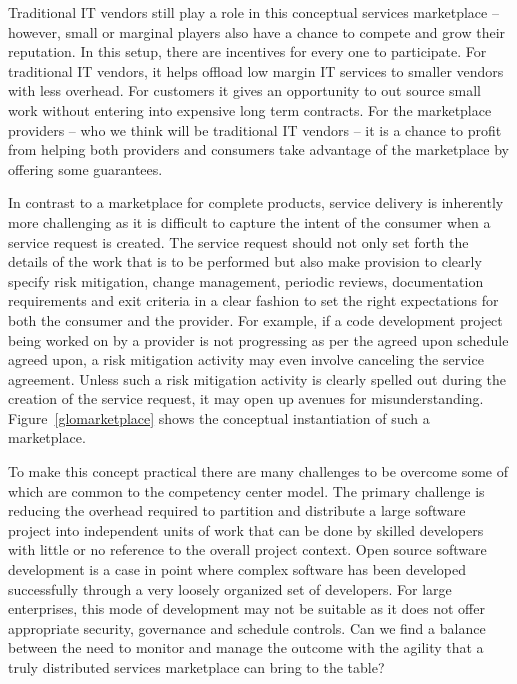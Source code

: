  Traditional IT vendors still play a role in this conceptual services marketplace -- however, small or marginal players also have a chance to compete and grow their reputation. In this setup, there are incentives for every one to participate. For traditional IT vendors, it helps offload low margin IT services to smaller vendors with less overhead. For customers it gives an opportunity to out source small work without entering into expensive long term contracts. For the marketplace providers -- who we think will be traditional IT vendors -- it is a chance to profit from helping both providers and consumers take advantage of the marketplace by offering some guarantees.

In contrast to a marketplace for complete products, service delivery is inherently more challenging as it is difficult to capture the intent of the consumer when a service request is created. The service request should not only set forth the details of the work that is to be performed but also make provision to clearly specify risk mitigation, change management, periodic reviews, documentation requirements and exit criteria in a clear fashion to set the right expectations for both the consumer and the provider.  For example, if a code development project being worked on by a provider is not progressing as per the agreed upon schedule agreed upon, a risk mitigation activity may even involve canceling the service agreement. Unless such a risk mitigation activity is clearly spelled out during the creation of the service request, it may open up avenues for misunderstanding. Figure~\ref{glomarketplace} shows the conceptual instantiation of such a marketplace.

 To make this concept practical there are many challenges to be overcome some of which are common to the competency center model. The primary challenge is reducing the overhead required to partition and distribute a large software project into independent units of work that can be done by skilled developers with little or no reference to the overall project context. Open source software development is a case in point where complex software has been developed successfully through a very loosely organized set of developers. For large enterprises, this mode of development may not be suitable as it does not offer appropriate security, governance and schedule controls. Can we find a balance between the need to monitor and manage the outcome with the agility that a truly distributed services marketplace can bring to the table?

